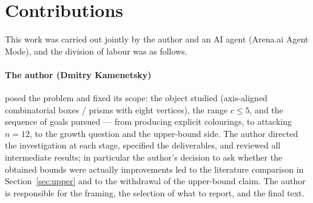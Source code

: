 \documentclass[11pt]{article}
\theoremstyle{definition}
\begin{document}
\section*{Contributions}

This work was carried out jointly by the author and an AI agent (Arena.ai Agent Mode),
and the division of labour was as follows.

\paragraph{The author (Dmitry Kamenetsky)} posed the problem and fixed its scope: the
object studied (axis-aligned combinatorial boxes / prisms with eight vertices), the range
$c\le5$, and the sequence of goals pursued --- from producing explicit colourings, to
attacking $n=12$, to the growth question and the upper-bound side. The author directed the
investigation at each stage, specified the deliverables, and reviewed all intermediate
results; in particular the author's decision to ask whether the obtained bounds were
actually improvements led to the literature comparison in Section~\ref{sec:upper} and to
the withdrawal of the upper-bound claim. The author is responsible for the framing,
the selection of what to report, and the final text.
\end{document}
